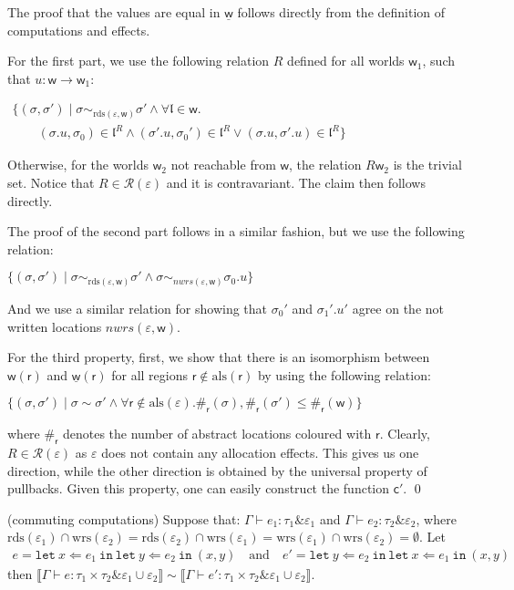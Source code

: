 \documentclass[orivec]{llncs}
\newif\iffull\fullfalse
\newcommand{\keywd}[1]{\mathtt{#1}}
\newcommand{\und}[1]{\underline{#1}}
\newcommand{\letin}[2]{\keywd{let}\:{#1}\!\Leftarrow\!{#2}\:\keywd{in}\:}
\newcommand{\rdsin}[1]{\mathrm{rds}({#1})}
\newcommand{\wrsin}[1]{\mathrm{wrs}({#1})}
\newcommand{\alsin}[1]{\mathrm{als}({#1})}
\newcommand{\eff}{\varepsilon}
\newcommand{\regid}{\ensuremath{\mathsf{r}}}
\newcommand{\sem}[1]{\ensuremath{\llbracket {#1} \rrbracket}}
\newcommand{\nwrs}{{\ensuremath{\mathit{nwrs}}}}
\renewenvironment{proof}{\vspace{-1mm} \noindent {\bf Proof}\quad}{\qed}
\newcommand{\loc}{\mathfrak{l}}
\newcommand\w{\ensuremath{\mathsf{w}}\xspace}
\newcommand\cval{\ensuremath{\mathsf{c}}\xspace}
\newcommand\Rscr{\ensuremath{\mathcal{R}}\xspace}
\newcommand{\ety}[2]{{#1}\mathrel{\&}{#2}}
\begin{document}
\iffull\begin{proof}
The proof that the values are equal in $\und{\w}$ follows directly from 
the definition of computations and effects.


For the first part,  we use the following relation $R$ defined for all
worlds $\w_1$, such that $u : \w \to \w_1$:

\(
\begin{array}{l}
 \{(\sigma, \sigma') \mid \sigma \sim_{\rdsin{\eff, \w}} \sigma' 
\land \forall \loc \in \w.\\
 \qquad (\sigma.u, \sigma_0) \in \loc^R \land
(\sigma'.u, \sigma_0') \in \loc^R \lor (\sigma.u, \sigma'.u) \in
\loc^R\}
\end{array}
\)

\noindent
Otherwise, for the worlds $\w_2$ not reachable from \w, the relation
$R\w_2$ is the trivial set. Notice that $R \in \Rscr(\eff)$ and it is
contravariant. The claim then 
follows directly.

The proof of the second part follows in a similar fashion, but we use the
following relation:

\(
\{(\sigma, \sigma') \mid \sigma \sim_{\rdsin{\eff, \w}} \sigma' 
\land \sigma \sim_{\nwrs(\eff, \w)} \sigma_0.u \}
\)

\noindent
And we use a similar relation for showing that $\sigma_0'$ and
$\sigma_1'.u'$ agree on the not written locations $\nwrs(\eff, \w)$.

For the third property, first, we show that there is an
isomorphism between $\w(\regid)$ and $\und{\w}(\regid)$ for all regions
$\regid \notin \alsin{\regid}$ by using the following relation:

\(
\{(\sigma, \sigma') \mid \sigma \sim \sigma' \land \forall
\regid \notin \alsin{\eff}. \#_\regid(\sigma), \#_\regid(\sigma')
\leq \#_\regid(\w) \} 
\)

\noindent
where $\#_\regid$ denotes the number of abstract locations coloured with 
$\regid$.
Clearly, $R \in
\Rscr(\eff)$ as $\eff$ does not contain any allocation effects. This gives
us one direction, while the other direction is obtained by the universal
property of pullbacks. Given this property, one can easily construct the 
function $\cval'$.
\end{proof}
\begin{proposition}\label{compr}
(commuting computations) Suppose that:
$
 \Gamma \vdash e_1 : \ety{\tau_1}{\eff_1}$ and
$\Gamma \vdash e_2 :
\ety{\tau_2}{\eff_2}
$,
where  $\rdsin{\eff_1} \cap \wrsin{\eff_2} = \rdsin{\eff_2} \cap
\wrsin{\eff_1}= 
\wrsin{\eff_1} \cap \wrsin{\eff_2} = \emptyset$. Let 
\[
 \begin{array}{l}
  e = \letin{x}{e_1} \letin{y}{e_2} (x, y) \quad \textrm{and} \quad
  e' = \letin{y}{e_2} \letin{x}{e_1} (x, y)
 \end{array}
\]
then $\sem{\Gamma \vdash e : \ety{ \tau_1 \times \tau_2 }{\eff_1\cup
\eff_2}} \sim \sem{\Gamma \vdash e' : \ety{ \tau_1 \times \tau_2
}{\eff_1\cup \eff_2}}$.
\end{proposition}
\end{document}
